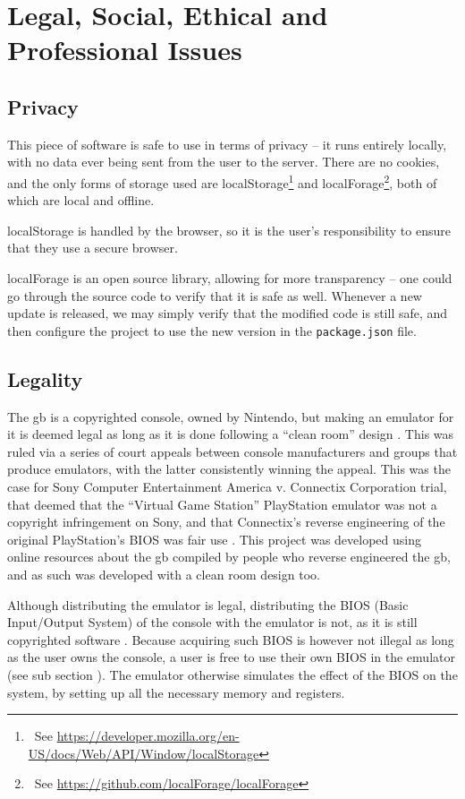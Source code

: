 \documentclass[11pt]{informatics-report}
\newcommand{\ftnt}[1]{\footnote{~See \url{#1}}}
\begin{document}
\chapter{Legal, Social, Ethical and Professional Issues}

\section{Privacy}

This piece of software is safe to use in terms of privacy -- it runs entirely locally, with no data ever being sent from the user to the server. There are no cookies, and the only forms of storage used are localStorage\ftnt{https://developer.mozilla.org/en-US/docs/Web/API/Window/localStorage} and localForage\ftnt{https://github.com/localForage/localForage}, both of which are local and offline.

localStorage is handled by the browser, so it is the user's responsibility to ensure that they use a secure browser.

localForage is an open source library, allowing for more transparency -- one could go through the source code to verify that it is safe as well. Whenever a new update is released, we may simply verify that the modified code is still safe, and then configure the project to use the new version in the \texttt{package.json} file.

\section{Legality}

The \glsdesc{gb} is a copyrighted console, owned by Nintendo, but making an emulator for it is deemed legal as long as it is done following a ``clean room'' design \cite{emulation_white_paper}. This was ruled via a series of court appeals between console manufacturers and groups that produce emulators, with the latter consistently winning the appeal. This was the case for Sony Computer Entertainment America v. Connectix Corporation trial, that deemed that the ``Virtual Game Station'' PlayStation emulator was not a copyright infringement on Sony, and that Connectix's reverse engineering of the original PlayStation's BIOS was fair use \cite{sony_v_connectix}. This project was developed using online resources about the \gls{gb} compiled by people who reverse engineered the \gls{gb}, and as such was developed with a clean room design too.

Although distributing the emulator is legal, distributing the BIOS (Basic Input/Output System) of the console with the emulator is not, as it is still copyrighted software \cite{emulation_white_paper}. Because acquiring such BIOS is however not illegal as long as the user owns the console, a user is free to use their own BIOS in the emulator (see sub section ). The emulator otherwise simulates the effect of the BIOS on the system, by setting up all the necessary memory and registers.
\end{document}
